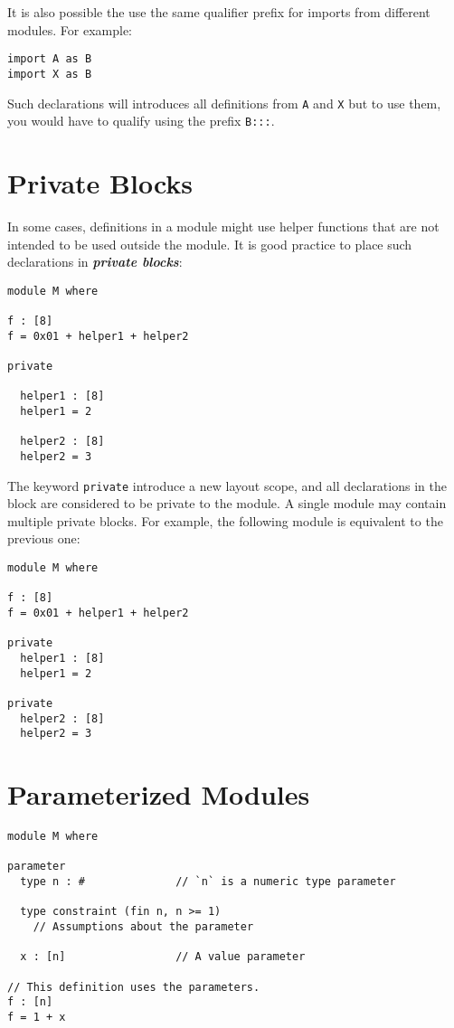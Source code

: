 It is also possible the use the same qualifier prefix for imports from
different modules. For example:

\begin{verbatim}
import A as B
import X as B
\end{verbatim}

Such declarations will introduces all definitions from \texttt{A} and
\texttt{X} but to use them, you would have to qualify using the prefix
\texttt{B:::}.

\hypertarget{private-blocks}{%
\section{Private Blocks}\label{private-blocks}}

In some cases, definitions in a module might use helper functions that
are not intended to be used outside the module. It is good practice to
place such declarations in \textbf{\emph{private blocks}}:

\begin{verbatim}
module M where

f : [8]
f = 0x01 + helper1 + helper2

private

  helper1 : [8]
  helper1 = 2

  helper2 : [8]
  helper2 = 3
\end{verbatim}

The keyword \texttt{private} introduce a new layout scope, and all
declarations in the block are considered to be private to the module. A
single module may contain multiple private blocks. For example, the
following module is equivalent to the previous one:

\begin{verbatim}
module M where

f : [8]
f = 0x01 + helper1 + helper2

private
  helper1 : [8]
  helper1 = 2

private
  helper2 : [8]
  helper2 = 3
\end{verbatim}

\hypertarget{parameterized-modules}{%
\section{Parameterized Modules}\label{parameterized-modules}}

\begin{verbatim}
module M where

parameter
  type n : #              // `n` is a numeric type parameter

  type constraint (fin n, n >= 1)
    // Assumptions about the parameter

  x : [n]                 // A value parameter

// This definition uses the parameters.
f : [n]
f = 1 + x
\end{verbatim}

